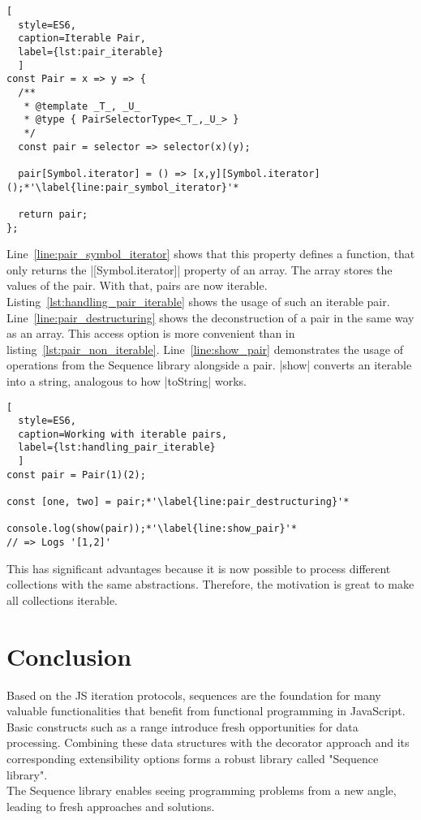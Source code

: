 \begin{lstlisting}[
  style=ES6, 
  caption=Iterable Pair,
  label={lst:pair_iterable}
  ]
const Pair = x => y => {
  /**
   * @template _T_, _U_
   * @type { PairSelectorType<_T_,_U_> }
   */
  const pair = selector => selector(x)(y);

  pair[Symbol.iterator] = () => [x,y][Symbol.iterator]();*'\label{line:pair_symbol_iterator}'*

  return pair;
};
\end{lstlisting}

Line~\ref{line:pair_symbol_iterator} shows that 
this property defines a function, that only returns the |[Symbol.iterator]|
property of an array. The array stores the values of the pair. With that, pairs
are now iterable. Listing~\ref{lst:handling_pair_iterable} shows the usage of
such an iterable pair. Line~\ref{line:pair_destructuring} shows the
deconstruction of a pair in the same way as an array. This access option is
more convenient than in listing~\ref{lst:pair_non_iterable}.
Line~\ref{line:show_pair} demonstrates the usage of operations from the Sequence
library alongside a pair. |show| converts an iterable into a string, analogous
to how |toString| works.

\begin{lstlisting}[
  style=ES6, 
  caption=Working with iterable pairs,
  label={lst:handling_pair_iterable}
  ]
const pair = Pair(1)(2);

const [one, two] = pair;*'\label{line:pair_destructuring}'*

console.log(show(pair));*'\label{line:show_pair}'*
// => Logs '[1,2]'
\end{lstlisting}

This has significant advantages because it is now possible to process different 
collections with the same abstractions. Therefore, the motivation is great to 
make all collections iterable.



\section{Conclusion}
\label{sec:chapter_2_conclusion}
Based on the JS iteration protocols, sequences are the foundation for many
valuable functionalities that benefit from functional programming in
JavaScript. Basic constructs such as a range introduce fresh opportunities for
data processing. Combining these data structures with the decorator approach
and its corresponding extensibility options forms a robust library called
"Sequence library".\\ 
The Sequence library enables seeing programming problems from a new angle,
leading to fresh approaches and solutions.
